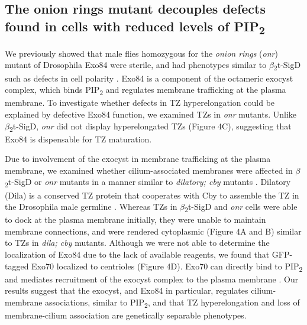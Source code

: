 \documentclass[12pt, twoside, letterpaper]{article}
\newcommand{\PIP}{PIP\textsubscript{2}}
\newcommand{\sigd}{$\beta$\textsubscript{2}t-SigD}
\begin{document}
\begin{doublespacing}
\begin{linenumbers}
    \subsection*{The onion rings mutant decouples defects found in cells with reduced levels of \PIP{}}
    We previously showed that male flies homozygous for the \textit{onion rings}
    (\textit{onr}) mutant of Drosophila Exo84 were sterile, and had phenotypes
    similar to \sigd{} such as defects in cell polarity \citep{wei2008depletion}.
    Exo84 is a component of the octameric exocyst complex, which binds
    \PIP{} and regulates membrane trafficking at the plasma membrane.
    To investigate whether defects in TZ hyperelongation could be explained by
    defective Exo84 function, we examined TZs in \textit{onr} mutants.
    Unlike \sigd{}, \textit{onr} did not display hyperelongated TZs (Figure 4C),
    suggesting that Exo84 is dispensable for TZ maturation.

    Due to involvement of the exocyst in membrane trafficking at the plasma membrane,
    we examined whether cilium-associated membranes were affected in \sigd{}
    or \textit{onr} mutants in a manner similar to \textit{dilatory; cby} mutants
    \citep{vieillard2016transition}. 
    Dilatory (Dila) is a conserved TZ protein that cooperates with Cby to assemble the TZ in
    the Drosophila male germline \citep{vieillard2016transition}.
    Whereas TZs in \sigd{} and \textit{onr} cells were able to dock
    at the plasma membrane initially, they were unable to maintain
    membrane connections, and were rendered cytoplasmic (Figure 4A and B) similar to TZs in
    \textit{dila; cby} mutants.
    Although we were not able to determine the localization of Exo84 due to the
    lack of available reagents,
    we found that GFP-tagged Exo70 localized to centrioles (Figure 4D).
    Exo70 can directly bind to \PIP{} and mediates recruitment of
    the exocyst complex to the plasma membrane \citep{he2007exo70}.
    Our results suggest that the exocyst, and Exo84 in particular, regulates
    cilium-membrane associations, similar to \PIP{}, and that TZ hyperelongation and loss of
    membrane-cilium association are genetically separable phenotypes.


\end{linenumbers}
\end{doublespacing}
\end{document}

